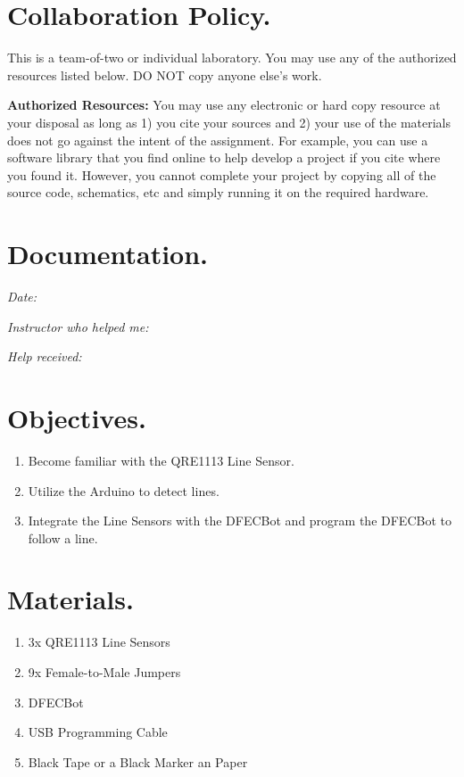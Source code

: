 \documentclass{handout}
\begin{document}
	\maketitle
	
	\section{Collaboration Policy.}
	This is a team-of-two or individual laboratory. You may use any of the authorized resources listed below. DO NOT copy anyone else’s work.
	
	\textbf{Authorized Resources:} You may use any electronic or hard copy resource at your disposal as long as 1) you cite your sources and 2) your use of the materials does not go against the intent of the assignment. For example, you can use a software library that you find online to help develop a project if you cite where you found it. However, you cannot complete your project by copying all of the source code, schematics, etc and simply running it on the required hardware.
	
	\section{Documentation.}
	\textit{Date:}
	
	\textit{Instructor who helped me:}
	
	\textit{Help received:}
	
	\section{Objectives.} 
	\begin{enumerate}
		\item Become familiar with the QRE1113 Line Sensor.
		\item Utilize the Arduino to detect lines.
		\item Integrate the Line Sensors with the DFECBot and program the DFECBot to follow a line.
	\end{enumerate}
	
	\section{Materials.}
	\begin{enumerate}
		\item 3x QRE1113 Line Sensors
		\item 9x Female-to-Male Jumpers
		\item DFECBot
		\item USB Programming Cable
		\item Black Tape or a Black Marker an Paper
	\end{enumerate}
	
\end{document}
